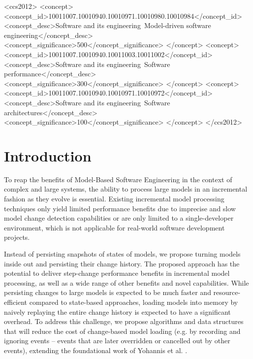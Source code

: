 \documentclass[sigconf]{acmart}
\begin{document}
%
%

\begin{CCSXML}
<ccs2012>
<concept>
<concept_id>10011007.10010940.10010971.10010980.10010984</concept_id>
<concept_desc>Software and its engineering~Model-driven software engineering</concept_desc>
<concept_significance>500</concept_significance>
</concept>
<concept>
<concept_id>10011007.10010940.10011003.10011002</concept_id>
<concept_desc>Software and its engineering~Software performance</concept_desc>
<concept_significance>300</concept_significance>
</concept>
<concept>
<concept_id>10011007.10010940.10010971.10010972</concept_id>
<concept_desc>Software and its engineering~Software architectures</concept_desc>
<concept_significance>100</concept_significance>
</concept>
</ccs2012>
\end{CCSXML}




\maketitle

\section{Introduction}
\label{sec:introduction}
To reap the benefits of Model-Based Software Engineering in the context of complex and large systems, the ability to process large models in an incremental fashion as they evolve is essential. Existing incremental model processing techniques only yield limited performance benefits due to imprecise and slow model change detection capabilities or are only limited to a single-developer environment, which is not applicable for real-world software development projects.


Instead of persisting snapshots of states of models, we propose turning models inside out and persisting their change history. The proposed approach has the potential to deliver step-change performance benefits in incremental model processing, as well as a wide range of other benefits and novel capabilities. While persisting changes to large models is expected to be much faster and resource-efficient compared to state-based approaches, loading models into memory by naively replaying the entire change history is expected to have a significant overhead. To address this challenge, we propose algorithms and data structures that will reduce the cost of change-based model loading (e.g. by recording and ignoring events -- events that are later overridden or cancelled out by other events), extending the foundational work of Yohannis et al. \cite{yohannis2017turning}.
\end{document}
